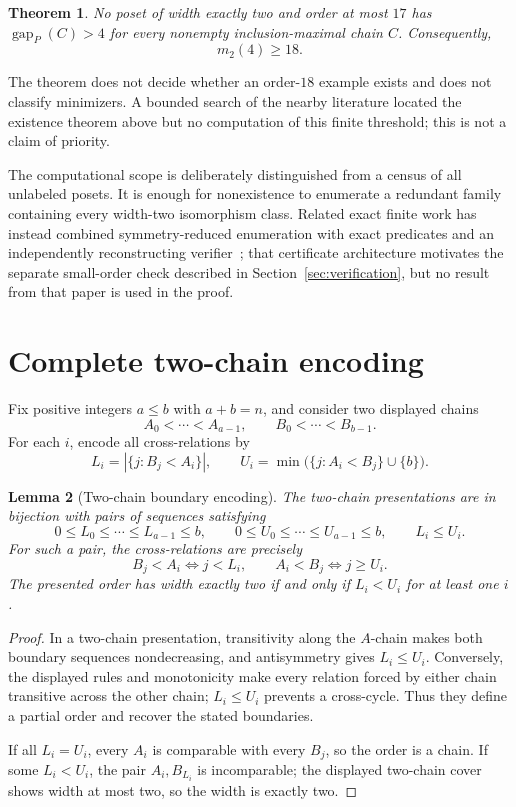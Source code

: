 \documentclass[11pt]{article}
\newtheorem{theorem}{Theorem}
\newtheorem{lemma}[theorem]{Lemma}
\theoremstyle{definition}
\newcommand{\gap}{\operatorname{gap}}
\begin{document}
\begin{theorem}\label{thm:main}
No poset of width exactly two and order at most $17$ has
$\gap_P(C)>4$ for every nonempty inclusion-maximal chain $C$.  Consequently,
\[
  m_2(4)\geq18.
\]
\end{theorem}

The theorem does not decide whether an order-$18$ example exists and does not
classify minimizers.  A bounded search of the nearby literature located the
existence theorem above but no computation of this finite threshold; this is
not a claim of priority.

The computational scope is deliberately distinguished from a census of all
unlabeled posets.  It is enough for nonexistence to enumerate a redundant
family containing every width-two isomorphism class.  Related exact finite
work has instead combined symmetry-reduced enumeration with exact predicates
and an independently reconstructing verifier~\cite{zeng2026finite}; that
certificate architecture motivates the separate small-order check described
in Section~\ref{sec:verification}, but no result from that paper is used in
the proof.

\section{Complete two-chain encoding}

Fix positive integers $a\leq b$ with $a+b=n$, and consider two displayed
chains
\[
 A_0<\cdots<A_{a-1},\qquad B_0<\cdots<B_{b-1}.
\]
For each $i$, encode all cross-relations by
\[
 L_i=|\{j:B_j<A_i\}|,
 \qquad
 U_i=\min\bigl(\{j:A_i<B_j\}\cup\{b\}\bigr).
\]

\begin{lemma}[Two-chain boundary encoding]\label{lem:encoding}
The two-chain presentations are in bijection with pairs of sequences satisfying
\[
 0\leq L_0\leq\cdots\leq L_{a-1}\leq b,
 \qquad
 0\leq U_0\leq\cdots\leq U_{a-1}\leq b,
 \qquad L_i\leq U_i.
\]
For such a pair, the cross-relations are precisely
\[
 B_j<A_i\iff j<L_i,\qquad A_i<B_j\iff j\geq U_i.
\]
The presented order has width exactly two if and only if $L_i<U_i$ for at
least one $i$.
\end{lemma}

\begin{proof}
In a two-chain presentation, transitivity along the $A$-chain makes both
boundary sequences nondecreasing, and antisymmetry gives $L_i\leq U_i$.
Conversely, the displayed rules and monotonicity make every relation forced
by either chain transitive across the other chain; $L_i\leq U_i$ prevents a
cross-cycle.  Thus they define a partial order and recover the stated
boundaries.

If all $L_i=U_i$, every $A_i$ is comparable with every $B_j$, so the order is
a chain.  If some $L_i<U_i$, the pair $A_i,B_{L_i}$ is incomparable; the
displayed two-chain cover shows width at most two, so the width is exactly
two.
\end{proof}
\end{document}
